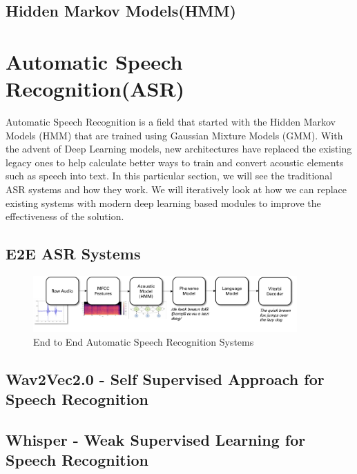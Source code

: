 \subsection{Hidden Markov Models(HMM)}%
\label{sec:hmm}



\section{Automatic Speech Recognition(ASR)}%
\label{sec:automaticspeechrecognition}

Automatic Speech Recognition is a field that started with the Hidden Markov Models (HMM) that are trained using Gaussian Mixture Models (GMM). With the advent of Deep Learning models, new architectures have replaced the existing legacy ones to help calculate better ways to train and convert acoustic elements such as speech into text. In this particular section, we will see the traditional ASR systems and how they work. We will iteratively look at how we can replace existing systems with modern deep learning based modules to improve the effectiveness of the solution.

\subsection{E2E ASR Systems}%
\label{sec:e2easrsystems}

\begin{figure}
    \centering
    \includegraphics[width=0.9\textwidth]{02-fundamentals/figures/e2e_asr.pdf}
    \caption{End to End Automatic Speech Recognition Systems}
    \label{fig:e2easr}
\end{figure}

\subsection{Wav2Vec2.0 - Self Supervised Approach for Speech Recognition}%
\label{sec:wav2vec2}

\subsection{Whisper - Weak Supervised Learning for Speech Recognition}%
\label{sec:whisper}

